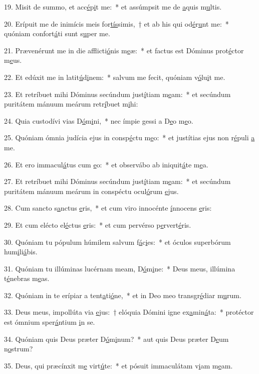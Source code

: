 19. Misit de summo, et acc\uline{é}p\uline{i}t me:~* et assúmpsit me de \uline{a}quis m\uline{u}ltis.\par 
20. Erípuit me de inimícis meis for\uline{tís}simis,~† et ab his qui od\uline{é}r\uline{u}nt me:~* quóniam confort\uline{á}ti sunt s\uline{u}per me.\par 
21. Prævenérunt me in die afflicti\uline{ó}nis m\uline{e}æ:~* et factus est Dóminus prot\uline{é}ctor m\uline{e}us.\par 
22. Et edúxit me in latit\uline{ú}d\uline{i}nem:~* salvum me fecit, quóniam v\uline{ó}lu\uline{i}t me.\par 
23. Et retríbuet mihi Dóminus secúndum just\uline{í}tiam m\uline{e}am:~* et secúndum puritátem mánuum meárum retr\uline{í}buet m\uline{i}hi:\par 
24. Quia custodívi vias D\uline{ó}m\uline{i}ni,~* nec ímpie gessi a D\uline{e}o m\uline{e}o.\par 
25. Quóniam ómnia judícia ejus in consp\uline{é}ctu m\uline{e}o:~* et justítias ejus non r\uline{é}puli \uline{a} me.\par 
26. Et ero immacul\uline{á}tus cum \uline{e}o:~* et observábo ab iniquit\uline{á}te m\uline{e}a.\par 
27. Et retríbuet mihi Dóminus secúndum just\uline{í}tiam m\uline{e}am:~* et secúndum puritátem mánuum meárum in conspéctu ocul\uline{ó}rum \uline{e}jus.\par 
28. Cum sancto s\uline{a}nctus \uline{e}ris,~* et cum viro innocénte \uline{í}nnocens \uline{e}ris:\par 
29. Et cum elécto el\uline{é}ctus \uline{e}ris:~* et cum pervérso p\uline{e}rvert\uline{é}ris.\par 
30. Quóniam tu pópulum húmilem salvum f\uline{á}c\uline{i}es:~* et óculos superbórum hum\uline{i}li\uline{á}bis.\par 
31. Quóniam tu illúminas lucérnam meam, D\uline{ó}m\uline{i}ne:~* Deus meus, illúmina t\uline{é}nebras m\uline{e}as.\par 
32. Quóniam in te erípiar a tent\uline{a}ti\uline{ó}ne,~* et in Deo meo transgr\uline{é}diar m\uline{u}rum.\par 
33. Deus meus, impollúta via \uline{e}jus:~† elóquia Dómini igne ex\uline{a}min\uline{á}ta:~* protéctor est ómnium sper\uline{á}ntium \uline{i}n se.\par 
34. Quóniam quis Deus præter D\uline{ó}m\uline{i}num?~* aut quis Deus præter D\uline{e}um n\uline{o}strum?\par 
35. Deus, qui præcínxit m\uline{e} virt\uline{ú}te:~* et pósuit immaculátam v\uline{i}am m\uline{e}am.\par 
